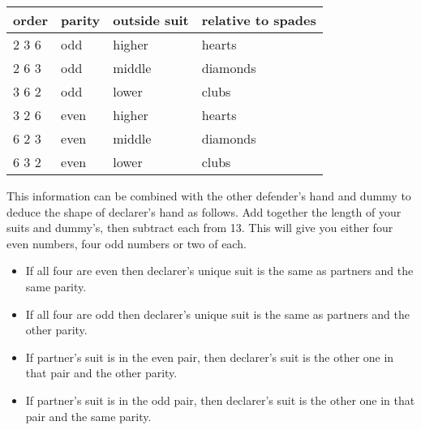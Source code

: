 \documentclass[a4paper,12pt]{article}
\begin{document}
\begin{tabular}{llll}
\bf order & \bf parity & \bf outside suit & \bf relative to spades \\
\hline
2 3 6 & odd    & higher       & hearts \\
2 6 3 & odd    & middle       & diamonds \\
3 6 2 & odd    & lower        & clubs \\
3 2 6 & even   & higher       & hearts \\
6 2 3 & even   & middle       & diamonds \\
6 3 2 & even   & lower        & clubs \\
\end{tabular}

This information can be combined with the other defender's hand and dummy to
deduce the shape of declarer's hand as follows. Add together the length of your
suits and dummy's, then subtract each from 13. This will give you either four
even numbers, four odd numbers or two of each.

\begin{itemize}
\item If all four are even then declarer's unique suit is the same as partners and the same parity.
\item If all four are odd then declarer's unique suit is the same as partners and the other parity.
\item If partner's suit is in the even pair, then declarer's suit is the other one in that pair and the other parity.
\item If partner's suit is in the odd pair, then declarer's suit is the other one in that pair and the same parity.
\end{itemize}
\end{document}

